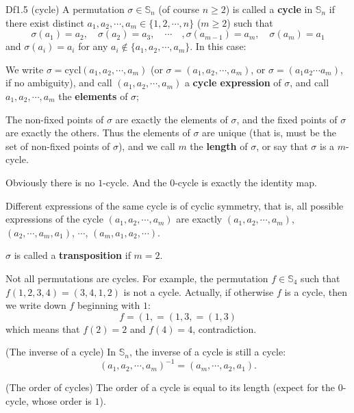 \documentclass{article}
\newcommand{\cycl}{\text{cycl}}
\begin{document}
\begin{Df}{Df1.5 (cycle)}
    A permutation $\sigma\in\mathbb{S}_n$ (of course $n\geq 2$) is called a \textbf{cycle} in $\mathbb{S}_n$ if there exist distinct $a_1, a_2, \cdots, a_m\in \{1,2,\cdots,n\}$ ($m\geq 2$) such that
    $$ \sigma(a_1) = a_2, \quad \sigma(a_2) = a_3, \quad \cdots \quad ,\sigma(a_{m-1}) = a_m, \quad \sigma(a_m) = a_1 $$
    and $\sigma(a_i) = a_i$ for any $a_i\notin \{a_1, a_2, \cdots, a_m\}$. In this case:
    \begin{compactenum}
        \item We write $\sigma = \cycl (a_1, a_2, \cdots, a_m)$ (or $\sigma = (a_1, a_2, \cdots, a_m)$, or $\sigma = (a_1a_2\cdots a_m)$, if no ambiguity), and call $(a_1, a_2, \cdots, a_m)$ a \textbf{cycle expression} of $\sigma$, and call $a_1, a_2, \cdots, a_m$ the \textbf{elements} of $\sigma$;
        \item \textcolor{Th}{The non-fixed points of $\sigma$ are exactly the elements of $\sigma$, and the fixed points of $\sigma$ are exactly the others.} Thus \textcolor{Th}{the elements of $\sigma$ are unique (that is, must be the set of non-fixed points of $\sigma$)}, and we call $m$ the \textbf{length} of $\sigma$, or say that $\sigma$ is a $m$-cycle.
        \item \textcolor{Th}{Obviously there is no $1$-cycle. And the $0$-cycle is exactly the identity map.}
        \item \textcolor{Th}{Different expressions of the same cycle is of cyclic symmetry, that is, all possible expressions of the cycle $(a_1, a_2, \cdots, a_m)$ are exactly $(a_1, a_2, \cdots, a_m)$, $(a_2, \cdots, a_m, a_1)$, $\cdots$, $(a_m, a_1, a_2, \cdots )$.}
        \item $\sigma$ is called a \textbf{transposition} if $m=2$.
    \end{compactenum}
\end{Df}

\begin{Rmk}{}
    \begin{compactenum}
        \item \textcolor{Th}{Not all permutations are cycles.} For example, the permutation $f\in\mathbb{S}_4$ such that $f(1,2,3,4) = (3,4,1,2)$ is not a cycle. Actually, if otherwise $f$ is a cycle, then we write down $f$ beginning with $1$:
        $$ f = \left(1, \right. = \left(1, 3, \right. = \left(1, 3\right) $$
        which means that $f(2) = 2$ and $f(4) = 4$, contradiction.
        \item \textcolor{Th}{(The inverse of a cycle) In $\mathbb{S}_n$, the inverse of a cycle is still a cycle:
        $$ (a_1, a_2, \cdots, a_m)^{-1} = (a_m, \cdots, a_2, a_1). $$}
        \item (The order of cycles) \textcolor{Th}{The order of a cycle is equal to its length (expect for the $0$-cycle, whose order is $1$).} 
    \end{compactenum}
\end{Rmk}
\end{document}
